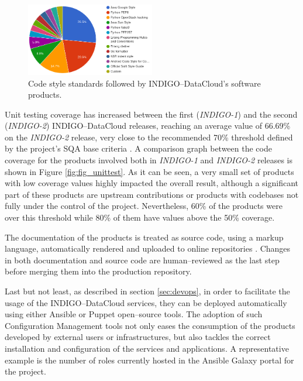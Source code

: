 \documentclass[journal]{IEEEtran}
\begin{document}
\begin{figure}[ht]
\centering
\includegraphics[width=0.5\textwidth]{images/codestyle.png}
\caption{Code style standards followed by INDIGO--DataCloud's software products.}
\label{fig:fig_codestyle}
\end{figure}

Unit testing coverage has increased between the first ({\sl INDIGO-1}) and the
second ({\sl INDIGO-2}) INDIGO--DataCloud releases, reaching an average value of
66.69\% on the {\sl INDIGO-2} release, very close to the recommended 70\% threshold
defined by the project’s SQA base criteria \cite{indigo-d31}. A comparison graph
between the code coverage for the products involved both in {\sl INDIGO-1} and
{\sl INDIGO-2} releases is shown in Figure \ref{fig:fig_unittest}. As it can be seen,
a very small set of products with low coverage values highly impacted the overall
result, although a significant part of these products are upstream contributions
or products with codebases not fully under the control of the project. Nevertheless,
60\% of the products were over this threshold while 80\% of them have values above
the 50\% coverage.

The documentation of the products is treated as source code, using a markup
language, automatically rendered and uploaded to online repositories
\cite{indigo-gitbook}. Changes in both documentation and source code are
human--reviewed as the last step before merging them into the production
repository.

Last but not least, as described in section \ref{sec:devops}, in order
to facilitate the usage of the INDIGO--DataCloud services, they can be deployed
automatically using either Ansible \cite{indigo-ansible} or Puppet
\cite{indigo-puppet} open--source tools. The adoption of such Configuration Management
tools not only eases the consumption of the products developed by external users or
infrastructures, but also tackles the correct installation and configuration of the
services and applications. A representative example is the number of roles currently
hosted in the Ansible Galaxy portal for the project.
\end{document}
